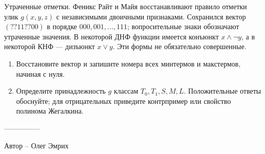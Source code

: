 \question
Утраченные отметки. Феникс Райт и Майя восстанавливают правило отметки улик $g(x,y,z)$ с независимыми двоичными признаками. Сохранился вектор $(??11??00)$ в порядке $000,001,\ldots,111$; вопросительные знаки обозначают утраченные значения. В некоторой ДНФ функции имеется конъюнкт $x\land\neg y$, а в некоторой КНФ --- дизъюнкт $x\lor y$. Эти формы не обязательно совершенные.
\begin{enumerate}
\item Восстановите вектор и запишите номера всех минтермов и макстермов, начиная с нуля.
\item Определите принадлежность $g$ классам $T_0,T_1,S,M,L$. Положительные ответы обоснуйте; для отрицательных приведите контрпример или свойство полинома Жегалкина.
\end{enumerate}

---------------

Автор -- Олег Эмрих
